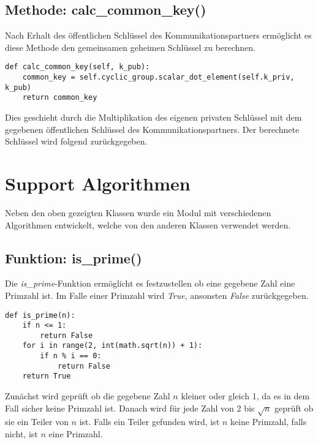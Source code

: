 \subsection{Methode: calc\_common\_key()}
Nach Erhalt des öffentlichen Schlüssel des Kommunikationspartners ermöglicht es diese Methode den gemeinsamen geheimen Schlüssel zu berechnen.

\vspace{\baselineskip}
\begin{lstlisting}[caption={Methode: calc\_common\_key()}, captionpos=b]
def calc_common_key(self, k_pub):
	common_key = self.cyclic_group.scalar_dot_element(self.k_priv, k_pub)
	return common_key
\end{lstlisting}
\vspace{\baselineskip}
Dies geschieht durch die Multiplikation des eigenen privaten Schlüssel mit dem gegebenen öffentlichen Schlüssel des Kommunikationspartners. Der berechnete Schlüssel wird folgend zurückgegeben.

\section{Support Algorithmen}
Neben den oben gezeigten Klassen wurde ein Modul mit verschiedenen Algorithmen entwickelt, welche von den anderen Klassen verwendet werden.

\subsection{Funktion: is\_prime()}
Die \textit{is\_prime}-Funktion ermöglicht es festzustellen ob eine gegebene Zahl eine Primzahl ist. Im Falle einer Primzahl wird \textit{True}, ansonsten \textit{False} zurückgegeben.
\vspace{\baselineskip}
\begin{lstlisting}[caption={Funktion: is\_prime()}, captionpos=b]
def is_prime(n):
    if n <= 1:
        return False
    for i in range(2, int(math.sqrt(n)) + 1):
        if n % i == 0:
            return False
    return True
\end{lstlisting}
\vspace{\baselineskip}
Zunächst wird geprüft ob die gegebene Zahl $n$ kleiner oder gleich 1, da es in dem Fall sicher keine Primzahl ist. Danach wird für jede Zahl von $2$ bis $\sqrt{n}$ geprüft ob sie ein Teiler von $n$ ist. Falls ein Teiler gefunden wird, ist $n$ keine Primzahl, falls nicht, ist $n$ eine Primzahl.

